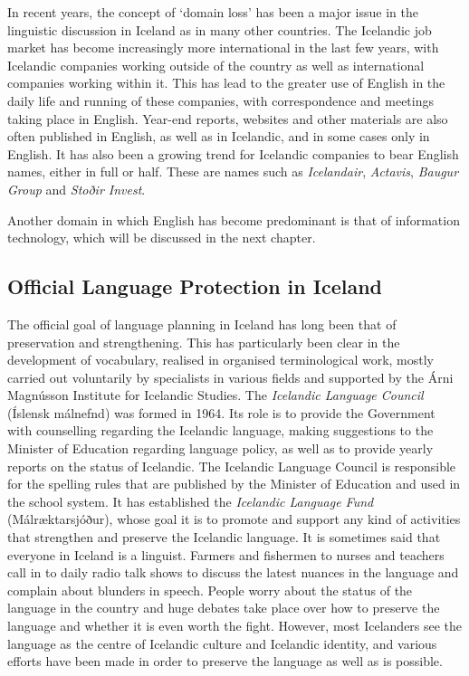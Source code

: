 \documentclass{../../metanetpaper}
\begin{document}
\begin{multicols}{2}
In recent years, the concept of ‘domain loss’ has been a major issue in the linguistic discussion in Iceland as in many other countries. The Icelandic job market has become increasingly more international in the last few years, with Icelandic companies working outside of the country as well as international companies working within it. This has lead to the greater use of English in the daily life and running of these companies, with correspondence and meetings taking place in English. Year-end reports, websites and other materials are also often published in English, as well as in Icelandic, and in some cases only in English. It has also been a growing trend for Icelandic companies to bear English names, either in full or half. These are names such as \textit{Icelandair}, \textit{Actavis}, \textit{Baugur Group} and \textit{Stoðir Invest}\cite{isl1}.  

Another domain in which English has become predominant is that of information technology, which will be discussed in the next chapter.

\subsection{Official Language Protection in Iceland}

The official goal of language planning in Iceland has long been that of preservation and strengthening. This has particularly been clear in the development of vocabulary, realised in organised terminological work, mostly carried out voluntarily by specialists in various fields and supported by the Árni Magnússon Institute for Icelandic Studies. The \textit{Icelandic Language Council} (Íslensk málnefnd) was formed in 1964\cite{arn1}.  Its role is to provide the Government with counselling regarding the Icelandic language, making suggestions to the Minister of Education regarding language policy, as well as to provide yearly reports on the status of Icelandic. The Icelandic Language Council is responsible for the spelling rules that are published by the Minister of Education and used in the school system. It has established the \textit{Icelandic Language Fund} (Málræktarsjóður), whose goal it is to promote and support any kind of activities that strengthen and preserve the Icelandic language\cite{arn2}.
It is sometimes said that everyone in Iceland is a linguist. Farmers and fishermen to nurses and teachers call in to daily radio talk shows to discuss the latest nuances in the language and complain about blunders in speech. People worry about the status of the language in the country and huge debates take place over how to preserve the language and whether it is even worth the fight. However, most Icelanders see the language as the centre of Icelandic culture and Icelandic identity, and various efforts have been made in order to preserve the language as well as is possible.


\end{multicols}
\end{document}
